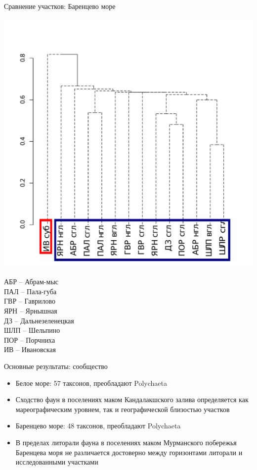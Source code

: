 \documentclass{beamer}
\begin{document}
\begin{frame}{Сравнение участков: Баренцево море}
	\begin{minipage}[b]{.70\linewidth}
		\includegraphics[width=\textwidth]{./Barents_fauna_tidal_jaccard_single_BW_1.pdf}
	\end{minipage}
\hfill
	\begin{minipage}[b]{.24\linewidth}
		\begin{tiny}
		АБР -- Абрам-мыс \\
		ПАЛ -- Пала-губа \\
		ГВР -- Гаврилово \\
		ЯРН -- Ярнышная \\
		ДЗ -- Даль\-не\-зе\-ле\-нец\-кая \\		
		ШЛП -- Шельпино \\
		ПОР -- Порчниха \\
		ИВ -- Ивановская \\
		\end{tiny}
	\end{minipage}

\end{frame}

\begin{frame}{Основные результаты: сообщество}
 \begin{itemize}
	\item Белое море: 57 таксонов, преобладают Polychaeta
	\item Сходство фаун в поселениях маком Кандалакшского залива определяется как мареографическим уровнем, так и географической близостью участков
	\item Баренцево море: 48 таксонов, преобладают Polychaeta
	\item В пределах литорали фауна в поселениях  маком Мурманского побережья Баренцева моря не различается достоверно между горизонтами литорали и исследованными участками
 \end{itemize}
\end{frame}
\end{document}

